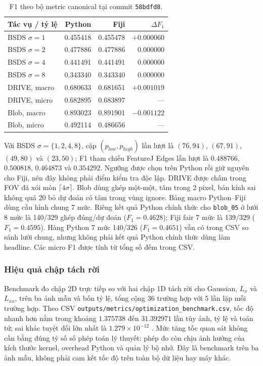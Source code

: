 \begin{table}[htbp]
\centering
\caption{F1 theo bộ metric canonical tại commit \texttt{58bdfd8}.}
\label{tab:repo-canonical-f1}
\begin{tabular}{lrrr}
\toprule
Tác vụ / tỷ lệ & Python & Fiji & $\Delta F_1$\\
\midrule
BSDS $\sigma=1$ & 0.455418 & 0.455478 & $+0.000060$\\
BSDS $\sigma=2$ & 0.477886 & 0.477886 & $0.000000$\\
BSDS $\sigma=4$ & 0.441491 & 0.441491 & $0.000000$\\
BSDS $\sigma=8$ & 0.343340 & 0.343340 & $0.000000$\\
DRIVE, macro & 0.680633 & 0.681651 & $+0.001019$\\
DRIVE, micro & 0.682895 & 0.683897 & ---\\
Blob, macro & 0.893023 & 0.891901 & $-0.001122$\\
Blob, micro & 0.492114 & 0.486656 & ---\\
\bottomrule
\end{tabular}
\end{table}

Với BSDS $\sigma=\{1,2,4,8\}$, cặp $(p_{low},p_{high})$ lần lượt là
$(76,94)$, $(67,91)$, $(49,80)$ và $(23,50)$; F1 tham chiếu FeatureJ Edges
lần lượt là $0.488766$, $0.500818$, $0.464873$ và $0.354292$. Ngưỡng được
chọn trên Python rồi giữ nguyên cho Fiji, nên đây không phải điểm kiểm tra
độc lập. DRIVE được chấm trong FOV đã xói mòn $\lceil4\sigma\rceil$.
Blob dùng ghép một-một, tâm trong 2 pixel, bán kính sai không quá 20%
bỏ dự đoán có tâm trong vùng ignore. Bảng macro Python--Fiji dùng cấu hình
chung 7 mức. Riêng kết quả Python chính thức cho \texttt{blob\_05} ở lưới
8 mức là 140/329 ghép đúng/dự đoán ($F_1=0.4628$); Fiji fair 7 mức là
139/329 ($F_1=0.4595$). Hàng Python 7 mức 140/326 ($F_1=0.4651$) vẫn có
trong CSV so sánh lưới chung, nhưng không phải kết quả Python chính thức
dùng làm headline. Các micro F1 được tính từ tổng số đếm trong CSV.

\subsubsection{Hiệu quả chập tách rời}
Benchmark đo chập 2D trực tiếp so với hai chập 1D tách rời cho Gaussian,
$L_x$ và $L_{xx}$, trên ba ảnh mẫu và bốn tỷ lệ, tổng cộng 36 trường hợp với
5 lần lặp mỗi trường hợp. Theo CSV
\texttt{outputs/metrics/optimization\_benchmark.csv}, tốc độ nhanh hơn
nằm trong khoảng $1.375738$ đến $31.392971$ lần tùy ảnh, tỷ lệ và toán tử;
sai khác tuyệt đối lớn nhất là $1.279\times10^{-12}$
\cite{xlaOptimizationBenchmark}. Mức tăng tốc quan sát
không cần bằng đúng tỷ số số phép toán lý thuyết: phép đo còn chịu ảnh hưởng
của kích thước kernel, overhead Python và quản lý bộ nhớ. Đây là benchmark
trên ba ảnh mẫu, không phải cam kết tốc độ trên toàn bộ dữ liệu hay máy khác.


